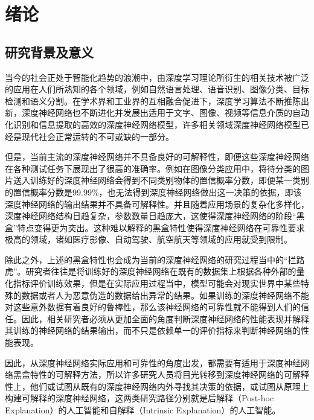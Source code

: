 


\chapter{绪论}
\thispagestyle{others}
\pagestyle{others}
\xiaosi

\section{研究背景及意义}
当今的社会正处于智能化趋势的浪潮中，由深度学习理论所衍生的相关技术被广泛的应用在人们所熟知的各个领域，例如自然语言处理\textsuperscript{\cite{language}}、语音识别\textsuperscript{\cite{voice}}、图像分类\textsuperscript{\cite{image,simonyan2014very}}、目标检测\textsuperscript{\cite{od1,od2}}和语义分割\textsuperscript{\cite{sg1,sg2}}。在学术界和工业界的互相融合促进下，深度学习算法不断推陈出新，深度神经网络也不断进化并发展出适用于文字、图像、视频等信息介质的自动化识别和信息提取的高效的深度神经网络模型，许多相关领域深度神经网络模型已经是现代社会正常运转的不可或缺的一部分。

但是，当前主流的深度神经网络并不具备良好的可解释性，即便这些深度神经网络在各种测试任务下展现出了很高的准确率。例如在图像分类应用中，将待分类的图片送入训练好的深度神经网络会得到不同类别物体的置信概率分数，即便某一类别的置信概率分数是99.99\%，也无法得到深度神经网络做出这一决策的依据\textsuperscript{\cite{machine}}，即该深度神经网络的输出结果并不具备可解释性。并且随着应用场景的复杂化多样化，深度神经网络结构日趋复杂，参数数量日趋庞大，这使得深度神经网络的阶段“黑盒”特点变得更为突出。这种难以解释的黑盒特性使得深度神经网络在可靠性要求极高的领域，诸如医疗影像、自动驾驶、航空航天\textsuperscript{\cite{arospace}}等领域的应用就受到限制。

除此之外，上述的黑盒特性也会成为当前的深度神经网络的研究过程当中的“拦路虎”。研究者往往是将训练好的深度神经网络在既有的数据集上根据各种外部的量化指标评价训练效果，但是在实际应用过程当中，模型可能会对现实世界中某些特殊的数据或者人为恶意伪造的数据给出异常的结果。如果训练的深度神经网络不能对这些意外数据有着良好的鲁棒性，那么该神经网络的可靠性就不能得到人们的信任。因此，相关研究者必须从更加全面的角度判断深度神经网络的性能表现并解释其训练的神经网络的结果输出，而不只是依赖单一的评价指标来判断神经网络的性能表现。

因此，从深度神经网络实际应用和可靠性的角度出发，都需要有适用于深度神经网络黑盒特性的可解释方法，所以许多研究人员将目光转移到深度神经网络的可解释性上，他们或试图从既有的深度神经网络内外寻找其决策的依据，或试图从原理上构建可解释的深度神经网络，这两类研究路径分别就是后解释（Post-hoc Explanation）\textsuperscript{\cite{post,post2}}的人工智能和自解释（Intrinsic Explanation）\textsuperscript{\cite{Intrinsic1,Intrinsic2,Intrinsic3,Intrinsic4,Intrinsic5,Intrinsic6}}的人工智能。

